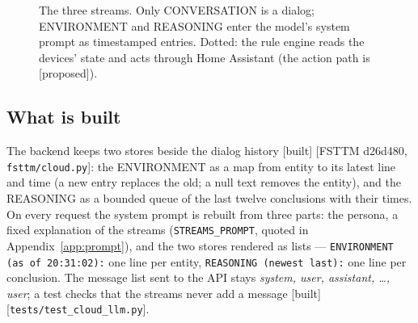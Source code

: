 \documentclass[11pt]{article}
\newcommand{\src}[1]{{\footnotesize\textsf{[#1]}}}
\newcommand{\built}{\textsf{\small[built]}}
\newcommand{\proposed}{\textsf{\small[proposed]}}
\begin{document}
\begin{figure}[t]
\centering
{}
\caption{The three streams. Only CONVERSATION is a dialog; ENVIRONMENT and REASONING enter
the model's system prompt as timestamped entries. Dotted: the rule engine reads the devices'
state and acts through Home Assistant (the action path is \proposed).}
\label{fig:streams}
\end{figure}

\subsection{What is built}

The backend keeps two stores beside the dialog history \built{} \src{FSTTM d26d480,
\texttt{fsttm/cloud.py}}: the ENVIRONMENT as a map from entity to its latest line and time
(a new entry replaces the old; a null text removes the entity), and the REASONING as a
bounded queue of the last twelve conclusions with their times. On every request the system
prompt is rebuilt from three parts: the persona, a fixed explanation of the streams
(\texttt{STREAMS\_PROMPT}, quoted in Appendix~\ref{app:prompt}), and the two stores rendered
as lists --- \texttt{ENVIRONMENT (as of 20:31:02):} one line per entity, \texttt{REASONING
(newest last):} one line per conclusion. The message list sent to the API stays
\emph{system, user, assistant, \dots, user}; a test checks that the streams never add a
message \built{} \src{\texttt{tests/test\_cloud\_llm.py}}.
\end{document}
